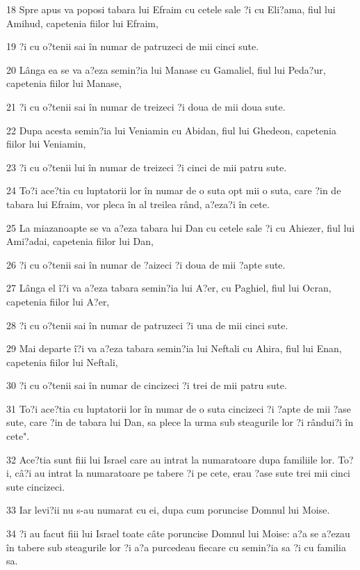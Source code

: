 \par 18 Spre apus va poposi tabara lui Efraim cu cetele sale ?i cu Eli?ama, fiul lui Amihud, capetenia fiilor lui Efraim,
\par 19 ?i cu o?tenii sai în numar de patruzeci de mii cinci sute.
\par 20 Lânga ea se va a?eza semin?ia lui Manase cu Gamaliel, fiul lui Peda?ur, capetenia fiilor lui Manase,
\par 21 ?i cu o?tenii sai în numar de treizeci ?i doua de mii doua sute.
\par 22 Dupa acesta semin?ia lui Veniamin cu Abidan, fiul lui Ghedeon, capetenia fiilor lui Veniamin,
\par 23 ?i cu o?tenii lui în numar de treizeci ?i cinci de mii patru sute.
\par 24 To?i ace?tia cu luptatorii lor în numar de o suta opt mii o suta, care ?in de tabara lui Efraim, vor pleca în al treilea rând, a?eza?i în cete.
\par 25 La miazanoapte se va a?eza tabara lui Dan cu cetele sale ?i cu Ahiezer, fiul lui Ami?adai, capetenia fiilor lui Dan,
\par 26 ?i cu o?tenii sai în numar de ?aizeci ?i doua de mii ?apte sute.
\par 27 Lânga el î?i va a?eza tabara semin?ia lui A?er, cu Paghiel, fiul lui Ocran, capetenia fiilor lui A?er,
\par 28 ?i cu o?tenii sai în numar de patruzeci ?i una de mii cinci sute.
\par 29 Mai departe î?i va a?eza tabara semin?ia lui Neftali cu Ahira, fiul lui Enan, capetenia fiilor lui Neftali,
\par 30 ?i cu o?tenii sai în numar de cincizeci ?i trei de mii patru sute.
\par 31 To?i ace?tia cu luptatorii lor în numar de o suta cincizeci ?i ?apte de mii ?ase sute, care ?in de tabara lui Dan, sa plece la urma sub steagurile lor ?i rândui?i în cete".
\par 32 Ace?tia sunt fiii lui Israel care au intrat la numaratoare dupa familiile lor. To?i, câ?i au intrat la numaratoare pe tabere ?i pe cete, erau ?ase sute trei mii cinci sute cincizeci.
\par 33 Iar levi?ii nu s-au numarat cu ei, dupa cum poruncise Domnul lui Moise.
\par 34 ?i au facut fiii lui Israel toate câte poruncise Domnul lui Moise: a?a se a?ezau în tabere sub steagurile lor ?i a?a purcedeau fiecare cu semin?ia sa ?i cu familia sa.

